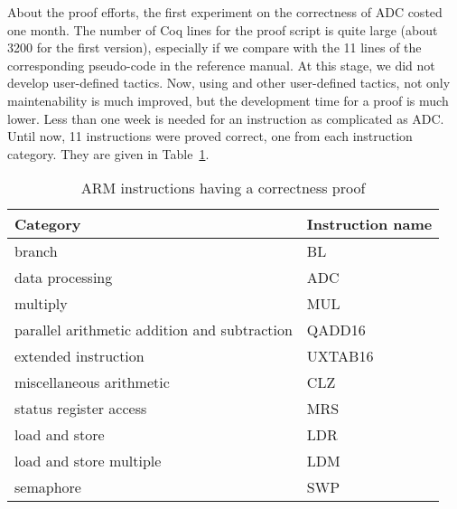 About the proof efforts,
the first experiment on the correctness of ADC
costed one month.
The number of Coq lines for the proof script is quite large
(about 3200 for the first version),
especially if we compare with the 11 lines of the corresponding
pseudo-code in the reference manual.
At this stage, we did not develop user-defined tactics.
Now, using \hcinv and other user-defined tactics,
not only maintenability is much improved,
but the development time for a proof is much lower.
Less than one week is needed for an instruction as complicated as ADC.
%
Until now, 11 instructions were proved correct,
one from each instruction category.
They are given in Table~\ref{tab:prvinst}.
\begin{table}[ht]
  \centering
  \begin{tabular}{|l|l|}
    \hline
    Category & Instruction name \\
    \hline
    branch & BL \\
    data processing & ADC \\
    multiply & MUL \\
    parallel arithmetic addition and subtraction & QADD16 \\
    extended instruction & UXTAB16 \\
    miscellaneous arithmetic & CLZ \\
    status register access & MRS \\
    load and store & LDR \\
    load and store multiple & LDM \\
    semaphore & SWP \\
    \hline
  \end{tabular}
  \smallskip
  \caption{ARM instructions having a correctness proof}
  \label{tab:prvinst}
\end{table}

